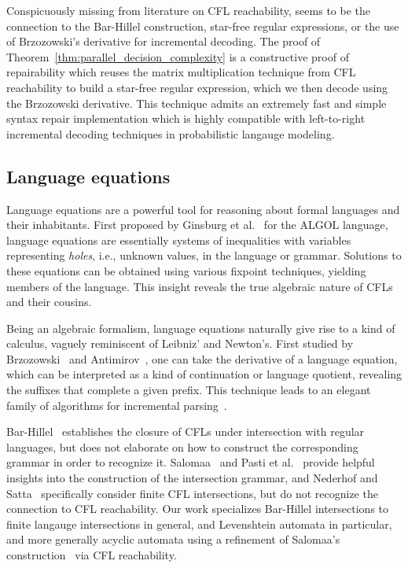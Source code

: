 \documentclass[sigplan,review,acmsmall,nonacm,screen,anonymous]{acmart}\settopmatter{printfolios=false,printccs=false,printacmref=false}
\begin{document}
Conspicuously missing from literature on CFL reachability, seems to be the connection to the Bar-Hillel construction, star-free regular expressions, or the use of Brzozowski's derivative for incremental decoding. The proof of Theorem~\ref{thm:parallel_decision_complexity} is a constructive proof of repairability which reuses the matrix multiplication technique from CFL reachability to build a star-free regular expression, which we then decode using the Brzozowski derivative. This technique admits an extremely fast and simple syntax repair implementation which is highly compatible with left-to-right incremental decoding techniques in probabilistic langauge modeling.

\subsection{Language equations}

Language equations are a powerful tool for reasoning about formal languages and their inhabitants. First proposed by Ginsburg et al.~\cite{ginsburg1962two} for the ALGOL language, language equations are essentially systems of inequalities with variables representing \textit{holes}, i.e., unknown values, in the language or grammar. Solutions to these equations can be obtained using various fixpoint techniques, yielding members of the language. This insight reveals the true algebraic nature of CFLs and their cousins.

Being an algebraic formalism, language equations naturally give rise to a kind of calculus, vaguely reminiscent of Leibniz' and Newton's. First studied by Brzozowski~\cite{brzozowski1964derivatives, brzozowski1980equations} and Antimirov~\cite{antimirov1996partial}, one can take the derivative of a language equation, which can be interpreted as a kind of continuation or language quotient, revealing the suffixes that complete a given prefix. This technique leads to an elegant family of algorithms for incremental parsing~\cite{might2011parsing, adams2016complexity}.

Bar-Hillel~\cite{bar1961formal} establishes the closure of CFLs under intersection with regular languages, but does not elaborate on how to construct the corresponding grammar in order to recognize it. Salomaa~\cite{salomaa1973formal} and Pasti et al.~\cite{pasti2023intersection} provide helpful insights into the construction of the intersection grammar, and Nederhof and Satta~\cite{nederhof2004language} specifically consider finite CFL intersections, but do not recognize the connection to CFL reachability. Our work specializes Bar-Hillel intersections to finite langauge intersections in general, and Levenshtein automata in particular, and more generally acyclic automata using a refinement of Salomaa's construction~\cite{salomaa1973formal} via CFL reachability.
\end{document}
